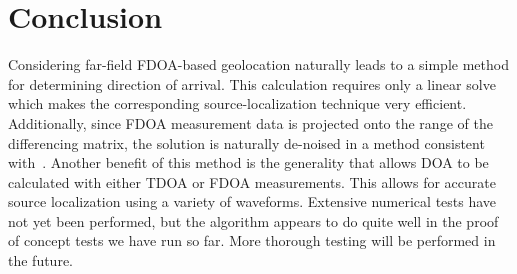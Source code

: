 \section{Conclusion}
\label{s:conclusion}
Considering far-field FDOA-based geolocation naturally leads to a simple method for determining direction of arrival. This calculation requires only a linear solve which makes the corresponding source-localization technique very efficient. Additionally, since FDOA measurement data is projected onto the range of the differencing matrix, the solution is naturally de-noised in a method consistent with~\cite{Schmidt1996,Compagnoni2017}. Another benefit of this method is the generality that allows DOA to be calculated with either TDOA or FDOA measurements. This allows for accurate source localization using a variety of waveforms. Extensive numerical tests have not yet been performed, but the algorithm appears to do quite well in the proof of concept tests we have run so far. More thorough testing will be performed in the future.
